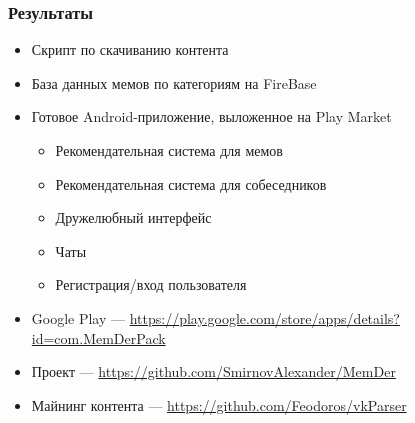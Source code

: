\documentclass[xetex,mathserif,serif]{beamer}
\begin{document}
	\begin{frame}
		\frametitle{Результаты}
		\begin{itemize}
		    \item Скрипт по скачиванию контента
			\item База данных мемов по категориям на FireBase
			\item Готовое Android-приложение, выложенное на Play Market
		    	\begin{itemize}
			    	\item Рекомендательная система для мемов
			    	\item Рекомендательная система для собеседников
			    	\item Дружелюбный интерфейс
			    	\item Чаты
			    	\item Регистрация/вход пользователя
			   	\end{itemize}
			\item Google Play — \url{https://play.google.com/store/apps/details?id=com.MemDerPack}
			\item Проект — \url{https://github.com/SmirnovAlexander/MemDer}
			\item Майнинг контента — \url{https://github.com/Feodoros/vkParser}
		\end{itemize}
	\end{frame}
\end{document}
